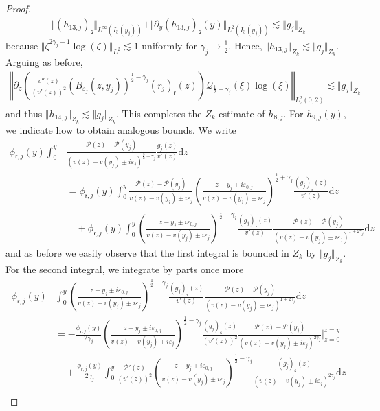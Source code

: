 \documentclass[11pt,reqno]{amsproc}
\theoremstyle{definition}
\numberwithin{equation}{section}
\newcommand{\sr}{{\mathsf{r}}}
\newcommand{\s}{{\mathsf{s}}}
\renewcommand{\d}{\mathrm{d}}
\newcommand{\ep}{\varepsilon}
\renewcommand{\P}{{\mathcal{P}}}
\begin{document}
\begin{proof}
\begin{align*}
\Vert \left(h_{13,j}\right)_\s \Vert_{L^\infty(I_3(y_j))} + \Vert \partial_y \left(h_{13,j}\right)_\s(y) \Vert_{L^2(I_3(y_j))} \lesssim \Vert g_j \Vert_{Z_k}
\end{align*}
because $\Vert \zeta^{2\gamma_j-1}\log(\zeta)\Vert_{L^2}\lesssim 1$ uniformly for $\gamma_j\rightarrow \frac12$. Hence, $\Vert h_{13,j} \Vert_{Z_k} \lesssim \Vert g_j \Vert_{Z_k}$. Arguing as before, 
\begin{align*}
\left \Vert \partial_ z \left( \frac{v''(z)}{(v'(z))^2}  \left( B_{\ep_j}^\pm(z,y_j) \right) ^{\frac12-\gamma_j} (r_j)_\sr(z)  \right) \mathcal{Q}_{\frac12-\gamma_j}(\xi)\log(\xi) \right \Vert_{L^2_z(0,2)}\lesssim \Vert g_j \Vert_{Z_k}
\end{align*}
and thus $\Vert h_{14,j} \Vert_{Z_k} \lesssim \Vert g_j \Vert_{Z_k}$. This completes the $Z_k$ estimate of $h_{8,j}$. For $h_{9,j}(y)$, we indicate how to obtain analogous bounds. We write
\begin{align*}
\phi_{\sr,j}(y)\int_0^y &\frac{\P(z) - \P(y_j)}{(v(z) - v(y_j) \pm i\ep_j)^{\frac32+\gamma_j}}\frac{g_j(z)}{v'(z)} \d z \\
&= \phi_{\sr,j}(y)\int_0^y \frac{\P(z) - \P(y_j)}{v(z) - v(y_j) \pm i\ep_j}\left( \frac{z-y_j \pm i\ep_{0,j}}{v(z) - v(y_j) \pm i\ep_j} \right)^{\frac12+\gamma_j}\frac{(g_j)_\sr(z)}{v'(z)} \d z \\
&\quad + \phi_{\sr,j}(y)\int_0^y \left( \frac{z-y_j \pm i\ep_{0,j}}{v(z) - v(y_j) \pm i\ep_j} \right)^{\frac12-\gamma_j}\frac{(g_j)_\sr(z)}{v'(z)}\frac{\P(z) - \P(y_j)}{(v(z) - v(y_j) \pm i\ep_j)^{1+2\gamma_j}} \d z 
\end{align*} 
and as before we easily observe that the first integral is bounded in $Z_k$ by $\Vert g_j \Vert_{Z_k}$. For the second integral, we integrate by parts once more
\begin{align*}
\phi_{\sr,j}(y) &\int_0^y \left( \frac{z-y_j \pm i\ep_{0,j}}{v(z) - v(y_j) \pm i\ep_j} \right)^{\frac12-\gamma_j}\frac{(g_j)_\s(z)}{v'(z)}\frac{\P(z) - \P(y_j)}{(v(z) - v(y_j) \pm i\ep_j)^{1+2\gamma_j}} \d z \\
&= -\frac{\phi_{\sr,j}(y)}{2\gamma_j} \left( \frac{z-y_j \pm i\ep_{0,j}}{v(z) - v(y_j) \pm i\ep_j} \right)^{\frac12-\gamma_j}\frac{(g_j)_\s(z)}{(v'(z))^2}\frac{\P(z) - \P(y_j)}{(v(z) - v(y_j) \pm i\ep_j)^{2\gamma_j}} \Big|_{z=0}^{z=y} \\
&\quad + \frac{\phi_{\sr,j}(y)}{2\gamma_j}\int_0^y \frac{\P'(z)}{(v'(z))^2}\left( \frac{z-y_j \pm i\ep_{0,j}}{v(z) - v(y_j) \pm i\ep_j} \right)^{\frac12-\gamma_j} \frac{(g_j)_\s(z)}{(v(z) - v(y_j) \pm i\ep_j)^{2\gamma_j}} \d z \\

\end{align*}
\end{proof}
\end{document}
